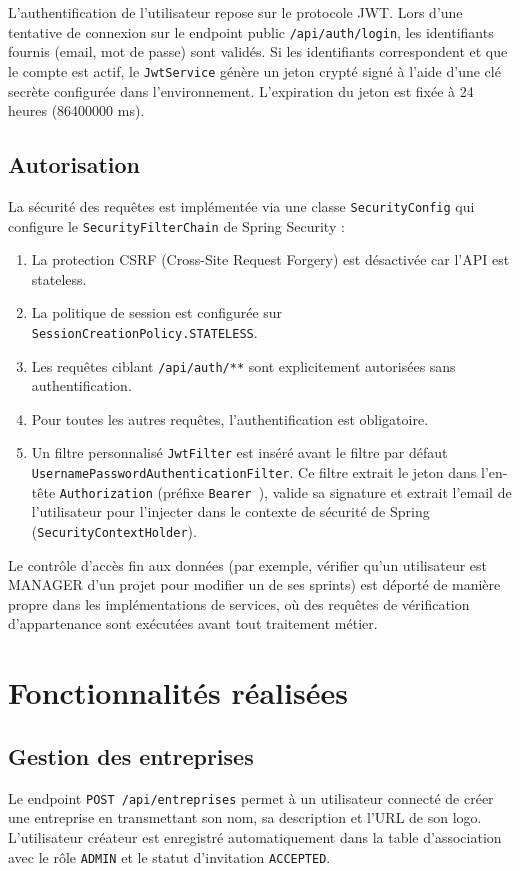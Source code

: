 \documentclass[12pt,a4paper]{report}
\begin{document}
L'authentification de l'utilisateur repose sur le protocole JWT. Lors d'une tentative de connexion sur le endpoint public \verb|/api/auth/login|, les identifiants fournis (email, mot de passe) sont validés. Si les identifiants correspondent et que le compte est actif, le \verb|JwtService| génère un jeton crypté signé à l'aide d'une clé secrète configurée dans l'environnement. L'expiration du jeton est fixée à 24 heures (86400000 ms).

\subsection{Autorisation}

La sécurité des requêtes est implémentée via une classe \verb|SecurityConfig| qui configure le \verb|SecurityFilterChain| de Spring Security :
\begin{enumerate}
\item La protection CSRF (Cross-Site Request Forgery) est désactivée car l'API est stateless.
\item La politique de session est configurée sur \verb|SessionCreationPolicy.STATELESS|.
\item Les requêtes ciblant \verb|/api/auth/**| sont explicitement autorisées sans authentification.
\item Pour toutes les autres requêtes, l'authentification est obligatoire.
\item Un filtre personnalisé \verb|JwtFilter| est inséré avant le filtre par défaut \verb|UsernamePasswordAuthenticationFilter|. Ce filtre extrait le jeton dans l'en-tête \verb|Authorization| (préfixe \verb|Bearer |), valide sa signature et extrait l'email de l'utilisateur pour l'injecter dans le contexte de sécurité de Spring (\verb|SecurityContextHolder|).
\end{enumerate}

Le contrôle d'accès fin aux données (par exemple, vérifier qu'un utilisateur est MANAGER d'un projet pour modifier un de ses sprints) est déporté de manière propre dans les implémentations de services, où des requêtes de vérification d'appartenance sont exécutées avant tout traitement métier.

\section{Fonctionnalités réalisées}

\subsection{Gestion des entreprises}
Le endpoint \verb|POST /api/entreprises| permet à un utilisateur connecté de créer une entreprise en transmettant son nom, sa description et l'URL de son logo. L'utilisateur créateur est enregistré automatiquement dans la table d'association avec le rôle \verb|ADMIN| et le statut d'invitation \verb|ACCEPTED|.
\end{document}
